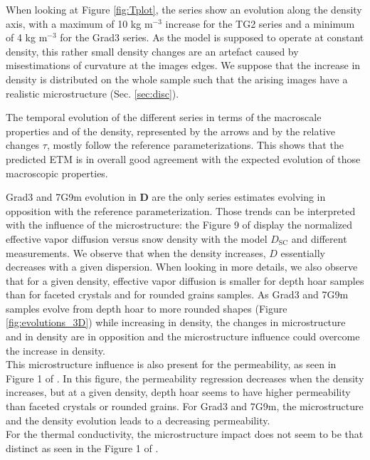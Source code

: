 \documentclass[draft,ms]{agujournal2019}
\begin{document}
When looking at Figure \ref{fig:Tplot}, the series show an evolution along the density axis, with a maximum of 10 kg m$^{-3}$ increase for the TG2 series and a minimum of 4 kg m$^{-3}$ for the Grad3 series. As the model is supposed to operate at constant density, this rather small density changes are an artefact caused by misestimations of curvature at the images edges. We suppose that the increase in density is distributed on the whole sample such that the arising images have a realistic microstructure (Sec. \ref{sec:disc}).

The temporal evolution of the different series in terms of the macroscale properties and of the density, represented by the arrows and by the relative changes $\tau$, mostly follow the reference parameterizations. This shows that the predicted ETM is in overall good agreement with the expected evolution of those macroscopic properties. 

Grad3 and 7G9m evolution in \textbf{D} are the only series estimates evolving in opposition with the reference parameterization. Those trends can be interpreted with the influence of the microstructure: the Figure 9 of  display the normalized effective vapor diffusion versus snow density with the model $D_{\mathrm{SC}}$ and different measurements. We observe that when the density increases, $D$ essentially decreases with a given dispersion. When looking in more details, we also observe that for a given density, effective vapor diffusion is smaller for depth hoar samples than for faceted crystals and for rounded grains samples. As Grad3 and 7G9m samples evolve from depth hoar to more rounded shapes (Figure \ref{fig:evolutions_3D}) while increasing in density, the changes in microstructure and in density are in opposition and the microstructure influence could overcome the increase in density. \\
This microstructure influence is also present for the permeability, as seen in Figure 1 of . In this figure, the permeability regression decreases when the density increases, but at a given density, depth hoar seems to have higher permeability than faceted crystals or rounded grains. For Grad3 and 7G9m, the microstructure and the density evolution leads to a decreasing permeability.\\
For the thermal conductivity, the microstructure impact does not seem to be that distinct as seen in the Figure 1 of .
\end{document}
